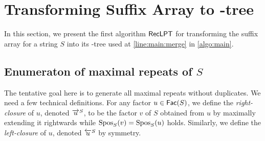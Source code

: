 



\section{Transforming Suffix Array to \LPTrm-tree}
\label{sec:sa:to:lpt}

In this section, we present the first algorithm $\textsf{RecLPT}$ for transforming the suffix array for a string $S$ into its \LPTrm-tree used at \cref{line:main:merge} in \cref{algo:main}.


\subsection{Enumeraton of maximal repeats of $S$}  
\label{sec:enum:maxrep}
The tentative goal here is to generate all maximal repeats without duplicates. 
We need a few technical definitions. 
For any factor $u \in \mathsf{Fac}{(S)}$, we define the \textit{right-closure} of $u$, denoted $\overrightarrow{u}^{S}$, to be the factor $v$ of $S$ obtained from $u$ by maximally extending it rightwards while $\mathrm{Spos}_{S}(v) = \mathrm{Spos}_{S}(u)$ holds. 
Similarly, we define the \textit{left-closure} of $u$, denoted $\overleftarrow{u}^{S}$ by symmetry. 

